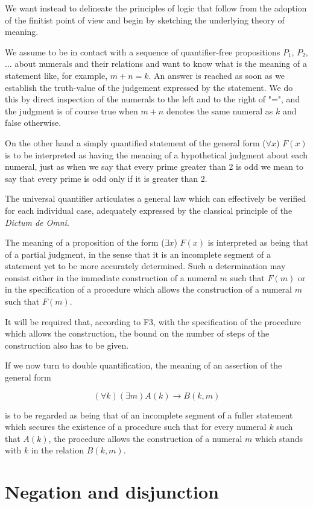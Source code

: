 \documentclass[12pt]{article}
\begin{document}
We want instead to delineate the principles of logic that follow from the adoption of the finitist point of view and begin by sketching the underlying theory of meaning.

We assume to be in contact with a sequence of quantifier-free propositions $P_1$, $P_2$, $\ldots$ about numerals and their relations and want to know what is the meaning of a statement like, for example, $m + n = k$. An answer is   reached as soon as we establish the truth-value of the judgement expressed by the statement. We do this by direct inspection of the numerals to the left and to the right of "=", and the judgment is of course true when $m + n$ denotes the same numeral as $k$ and false otherwise.

On the other hand a simply quantified statement of the general form ($\forall x$) $F(x)$ is to be interpreted as having the meaning of a hypothetical judgment about each numeral, just as when we say that every prime greater than 2 is odd we mean to say that every prime is odd only if it is greater than 2.

The universal quantifier articulates a general law which can effectively be verified for each individual case, adequately expressed by the classical principle of the \emph{Dictum de Omni}.

The meaning of a proposition of the form ($\exists x$) $F (x)$ is interpreted as being that of a partial judgment, in the sense that it is an incomplete segment of a statement yet to be more accurately determined. Such a determination may consist either in the immediate construction of a numeral $m$ such that $F (m)$ or in the specification of a procedure which allows the construction of a numeral $m$ such that $F (m)$.

It will be required that, according to F3, with the specification of the procedure which allows the construction, the bound on the number of steps of the construction also has to be given.
 
If we now turn to double quantification, the meaning of an assertion of the general form
 
$$(\forall k) (\exists m) A (k) \rightarrow  B (k, m)$$
 
is to be regarded as being that of an incomplete segment of a fuller statement which secures the existence of a procedure such that for every numeral $k$ such that $A (k)$, the procedure allows the construction of a numeral $m$ which stands with $k$ in the relation $B (k, m)$.

\section{Negation and disjunction}\normalsize
\end{document}
